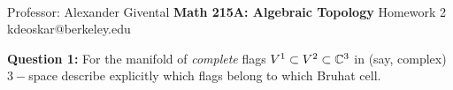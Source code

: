 \documentclass[11pt]{article}
\begin{document}
\thispagestyle{empty}
\bigskip \
\vspace{0.1cm}

\begin{center}
{\fontsize{22}{22} \selectfont Professor: Alexander Givental}
\vskip 16pt
{\fontsize{30}{30} \selectfont \bf \sffamily Math 215A: Algebraic Topology}
\vskip 24pt
{\fontsize{14}{14} \selectfont \rmfamily Homework 2} 
\vskip 6pt
{\fontsize{14}{14} \selectfont \ttfamily kdeoskar@berkeley.edu} 
\vskip 24pt
\end{center}



\begin{bluebox}
  \textbf{Question 1:} For the manifold of \textit{complete} flags $V^1 \subset V^2 \subset \mathbb{C}^3$ in (say, complex) $3-$space describe explicitly which flags belong to which Bruhat cell.
\end{bluebox}
\end{document}
